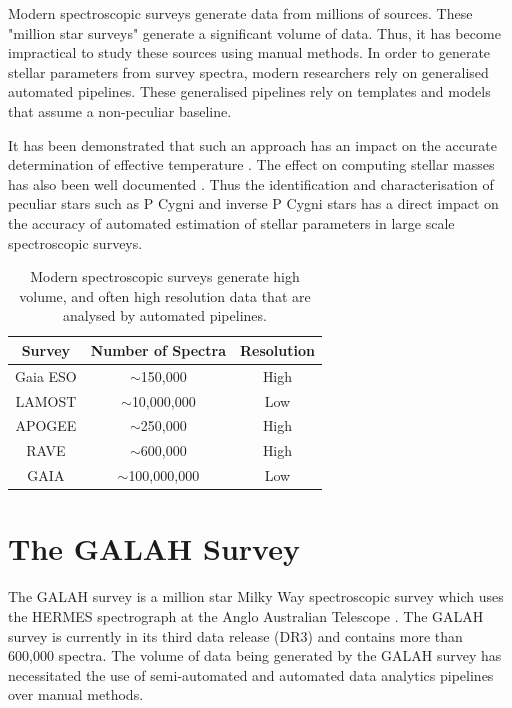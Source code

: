 Modern spectroscopic surveys generate data from millions of sources. These "million star surveys" generate a significant volume of data. Thus, it has become impractical to study these sources using manual methods. In order to generate stellar parameters from survey spectra, modern researchers rely on generalised automated pipelines. These generalised pipelines rely on templates and models that assume a non-peculiar baseline. 

It has been demonstrated that such an approach has an impact on the accurate determination of effective temperature \cite{cayrel2011halpha}\cite{amarsi2018effective}\cite{giribaldi2019accurate}. The effect on computing stellar masses has also been well documented \cite{ness2016spectroscopic}\cite{bergemann2016gaia}. Thus the identification and characterisation of peculiar stars such as P Cygni and inverse P Cygni stars has a direct impact on the accuracy of automated estimation of stellar parameters in large scale spectroscopic surveys. 

\begin{table}[]
\begin{center}
\begin{tabular}{|c|c|c|}
\hline
\textbf{Survey} & \textbf{Number of Spectra} & \textbf{Resolution} \\ \hline
Gaia ESO        & $\sim$150,000              & High                \\ \hline
LAMOST          & $\sim$10,000,000           & Low                 \\ \hline
APOGEE          & $\sim$250,000              & High                \\ \hline
RAVE            & $\sim$600,000              & High                \\ \hline
GAIA            & $\sim$100,000,000          & Low                 \\ \hline
\end{tabular}
\caption{Modern spectroscopic surveys generate high volume, and often high resolution data that are analysed by automated pipelines.}
\label{table:draglift1}
\end{center}
\end{table}

\section{The GALAH Survey}

The GALAH survey is a million star Milky Way spectroscopic survey which uses the HERMES spectrograph at the Anglo Australian Telescope \cite{de2015galah} \cite{buder2021galah+}. The GALAH survey is currently in its third data release (DR3) and contains more than 600,000 spectra. The volume of data being generated by the GALAH survey has necessitated the use of semi-automated and automated data analytics pipelines over manual methods.


